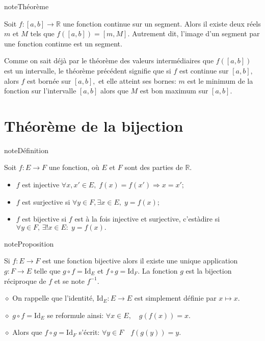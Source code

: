 \documentclass[letterpaper,10pt,french]{jupyterBook}
\begin{document}
\begin{sphinxadmonition}{note}{Théorème}

\sphinxAtStartPar
Soit \(f:[a,b]\rightarrow\mathbb{R}\) une fonction continue sur un segment. Alors il existe deux réels \(m\) et \(M\) tels que \(f([a,b])=[m,M].\) Autrement dit, l’image d’un segment par une fonction continue est un segment.
\end{sphinxadmonition}

\sphinxAtStartPar
Comme on sait déjà par le théorème des valeurs intermédiaires que \(f([a,b])\) est un intervalle, le théorème précédent signifie que si \(f\) est continue sur \([a,b],\) alors \(f\) est bornée sur \([a,b],\) et elle atteint ses bornes: \(m\) est le minimum de la fonction sur l’intervalle \([a,b]\) alors que \(M\) est bon maximum sur \([a,b].\)


\section{Théorème de la bijection}
\label{\detokenize{limitefcts:theoreme-de-la-bijection}}
\begin{sphinxadmonition}{note}{Définition}

\sphinxAtStartPar
Soit \(f:E\rightarrow F\) une fonction, où \(E\) et \(F\) sont des parties de \(\mathbb{R}.\)
\begin{itemize}
\item {} 
\sphinxAtStartPar
\(f\) est injective \(\forall x,x'\in E,\; f(x)=f(x')\Rightarrow x=x';\)

\item {} 
\sphinxAtStartPar
\(f\) est surjective si \(\forall y\in F,\exists x\in E,\;y=f(x);\)

\item {} 
\sphinxAtStartPar
\(f\) est bijective si \(f\) est à la fois injective et surjective, c’est\sphinxhyphen{}à\sphinxhyphen{}dire si \(\forall y\in F,\,\exists! x\in E:\;y=f(x).\)

\end{itemize}
\end{sphinxadmonition}

\begin{sphinxadmonition}{note}{Proposition}

\sphinxAtStartPar
Si \(f:E\rightarrow F\) est une fonction bijective alors il existe une unique application \(g:F\rightarrow E\) telle que \(g\circ f=\mbox{Id}_E\) et \(f\circ g=\mbox{Id}_F.\) La fonction \(g\) est la bijection réciproque de \(f\) et se note \(f^{-1}.\)

\sphinxAtStartPar
\(\diamond\) On rappelle que l’identité, Id\(_E:E\rightarrow E\) est simplement définie par \(x\mapsto x.\)

\sphinxAtStartPar
\(\diamond\) \(g\circ f=\)Id\(_E\) se reformule ainsi: \(\forall x\in E,\quad g(f(x))=x.\)

\sphinxAtStartPar
\(\diamond\) Alors que \(f\circ g=\mbox{Id}_F\) s’écrit: \(\forall y\in F\quad f(g(y))=y.\)
\end{sphinxadmonition}
\end{document}
